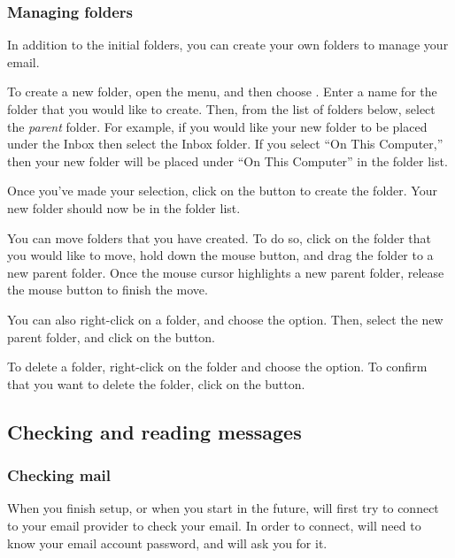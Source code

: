 \subsubsection{Managing folders}

In addition to the initial folders, you can create your own folders to manage
your email.

To create a new folder, open the  menu, and then choose
. Enter a name for the folder that you would like to create.
Then, from the list of folders below, select the \emph{parent} folder. For
example, if you would like your new folder to be placed under the Inbox then
select the Inbox folder. If you select ``On This Computer,'' then your new
folder will be placed under ``On This Computer'' in the folder list.

Once you've made your selection, click on the  button to 
create the folder. Your new folder should now be in the folder list.

You can move folders that you have created. To do so, click on the folder that
you would like to move, hold down the mouse button, and drag the folder
to a new parent folder. Once the mouse cursor highlights a new parent folder,
release the mouse button to finish the move.

You can also right-click on a folder, and choose the  option.
Then, select the new parent folder, and click on the  button.

To delete a folder, right-click on the folder and choose the 
option. To confirm that you want to delete the folder, click on the 
 button. 

\subsection{Checking and reading messages}

\subsubsection{Checking mail}

When you finish setup, or when you start  in the future, 
 will first try to connect to your email provider to check
your email. In order to connect,  will need to know your email
account password, and will ask you for it.


